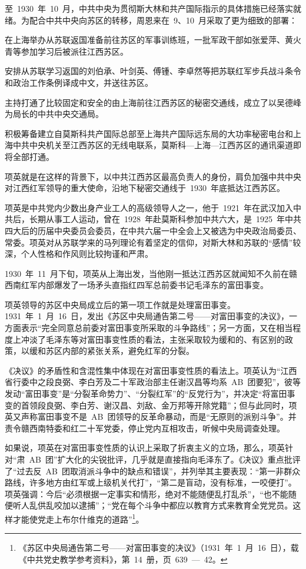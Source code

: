 至~1930~年~10~月，中共中央为贯彻斯大林和共产国际指示的具体措施已经落实就绪。为配合中共中央向苏区的转移，周恩来在~9、10~月采取了更为细致的部署：

在上海举办从苏联返国准备前往苏区的军事训练班，一批军政干部如张爱萍、黄火青等参加学习后被派往江西苏区。

安排从苏联学习返国的刘伯承、叶剑英、傅锺、李卓然等把苏联红军步兵战斗条令和政治工作条例译成中文，并送往苏区。

主持打通了比较固定和安全的由上海前往江西苏区的秘密交通线，成立了以吴德峰为局长的中共中央交通局。

积极筹备建立自莫斯科共产国际总部至上海共产国际远东局的大功率秘密电台和上海中共中央机关至江西苏区的无线电联系，莫斯科—上海—江西苏区的通讯渠道即将全部打通。

项英就是在这样的背景下，以中共江西苏区最高负责人的身份，肩负加强中共中央对江西红军领导的重大使命，沿地下秘密交通线于~1930~年底抵达江西苏区。

项英是中共党内少数出身产业工人的高级领导人之一，他于~1921~年在武汉加入中共后，长期从事工人运动，曾在~1928~年赴莫斯科参加中共六大，是~1925~年中共四大后的历届中央委员会委员，在中共六届一中全会上又被选为中央政治局委员、常委。项英对从苏联学来的马列理论有着坚定的信仰，对斯大林和苏联的“感情”较深，个人性格和作风则比较拘谨和严肃。

1930~年~11~月下旬，项英从上海出发，当他刚一抵达江西苏区就闻知不久前在赣西南红军内部爆发了一场矛头直指红四军总前委书记毛泽东的富田事变。

项英领导的苏区中央局成立后的第一项工作就是处理富田事变。1931~年~1~月~16~日，发出《苏区中央局通告第二号——对富田事变的决议》，一方面表示“完全同意总前委对富田事变所采取的斗争路线”；另一方面，又在相当程度上冲淡了毛泽东等对富田事变性质的看法，主张采取较为缓和的、有区别的政策，以缓和苏区内部的紧张关系，避免红军的分裂。

《决议》的矛盾性和含混性集中体现在对富田事变性质的看法上。项英认为“江西省行委中之段良弼、李白芳及二十军政治部主任谢汉昌等均系~AB~团要犯”，彼等发动“富田事变”是“分裂革命势力”、“分裂红军”的“反党行为”，并决定“将富田事变的首领段良弼、李白芳、谢汉昌、刘敌、金万邦等开除党籍”；但与此同时，项英又声称富田事变不是~AB~团领导的反革命暴动，而是“无原则的派别斗争”。并责令赣西南特委和红二十军党委，停止党内互相攻击，听候中央局调查处理。

如果说，项英在对富田事变性质的认识上采取了折衷主义的立场，那么，项英针对“肃~AB~团”扩大化的尖锐批评，几乎就是直接指向毛泽东了。《决议》重点批评了“过去反~AB~团取消派斗争中的缺点和错误”，并列举其主要表现：“第一非群众路线，许多地方由红军或上级机关代打”，“第二是盲动，没有标准，一咬便打”。项英强调：今后“必须根据一定事实和情形，绝对不能随便乱打乱杀”，“也不能随便听人乱供乱咬加以逮捕”；“党在每个斗争中都应以教育方式来教育全党党员。这样才能使党走上布尔什维克的道路”\footnote{《苏区中央局通告第二号——对富田事变的决议》（1931~年~1~月~16~日），载《中共党史教学参考资料》，第~14~册，页~639~—~42。}。

